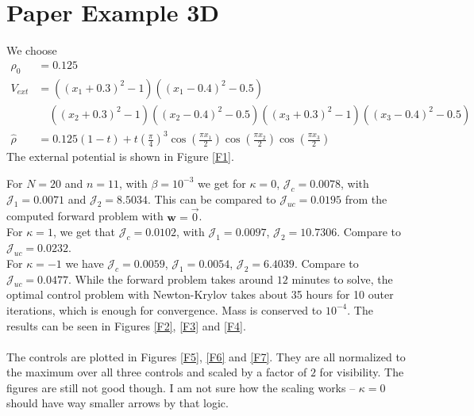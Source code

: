 \documentclass[11pt, a4paper]{article}
\theoremstyle{definition}
\newcommand{\w}{\mathbf{w}}
\newcommand{\hr}{\widehat \rho}
\begin{document}
	\section*{Paper Example 3D}
	We choose 
	\begin{align*}
		\rho_0 &= 0.125\\
		V_{ext} &= ((x_1 + 0.3)^2 - 1)((x_1 - 0.4)^2 - 0.5)\\
		&\quad ((x_2 + 0.3)^2 - 1)((x_2 - 0.4)^2 - 0.5)((x_3 + 0.3)^2 - 1)((x_3 - 0.4)^2 - 0.5)\\
		\hr &= 0.125(1-t) + t\left(\frac{\pi}{4}\right)^3\cos\left(\frac{\pi x_1}{2}\right)\cos\left(\frac{\pi x_2}{2}\right)\cos\left(\frac{\pi x_3}{2}\right)
	\end{align*}
	The external potential is shown in Figure \ref{F1}.
	
	For $N = 20$ and $n = 11$, with $\beta = 10^{-3}$ we get for $\kappa = 0$, $\mathcal J_c = 0.0078$, with $\mathcal J_1 = 0.0071$ and $\mathcal J_2 = 8.5034$.
	This can be compared to $\mathcal J_{uc} = 0.0195$ from the computed forward problem with $\w = \vec 0$.\\
	For $\kappa = 1$, we get that $\mathcal J_c = 0.0102$, with $\mathcal J_1 = 0.0097$, $\mathcal J_2 = 10.7306$. Compare to $\mathcal J_{uc} = 0.0232$. \\
	For $\kappa = -1$ we have $\mathcal J_c = 0.0059$, $\mathcal J_1 = 0.0054$, $\mathcal J_2 = 6.4039$. Compare to $\mathcal J_{uc} = 0.0477$.
	While the forward problem takes around $12$ minutes to solve, the optimal control problem with Newton-Krylov takes about 35 hours for 10 outer iterations, which is enough for convergence. Mass is conserved to $10^{-4}$. The results can be seen in Figures \ref{F2}, \ref{F3} and \ref{F4}. 
	\\
	\\
	The controls are plotted in Figures \ref{F5}, \ref{F6} and \ref{F7}. They are all normalized to the maximum over all three controls and scaled by a factor of $2$ for visibility. The figures are still not good though. I am not sure how the scaling works -- $\kappa = 0$ should have way smaller arrows by that logic.

	
\end{document}
